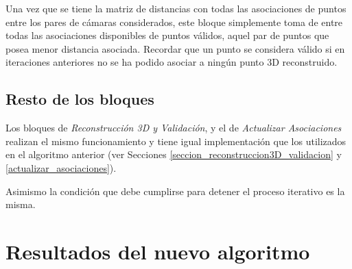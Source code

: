 Una vez que se tiene la matriz de distancias con todas las asociaciones de puntos entre los pares de cámaras considerados, este bloque simplemente toma de entre todas las asociaciones disponibles de puntos válidos, aquel par de puntos que posea menor distancia asociada.
Recordar que un punto se considera válido si en iteraciones anteriores no se ha podido asociar a ningún punto 3D reconstruido.

\subsection{Resto de los bloques}

Los bloques de \emph{Reconstrucción 3D y Validación}, y el de \emph{Actualizar Asociaciones} realizan el mismo funcionamiento y tiene igual implementación que los utilizados en el algoritmo anterior (ver Secciones \ref{seccion_reconstruccion3D_validacion} y \ref{actualizar_asociaciones}).

  Asimismo la condición que debe cumplirse para detener el proceso iterativo es la misma.

  
  
\section{Resultados del nuevo algoritmo}  


